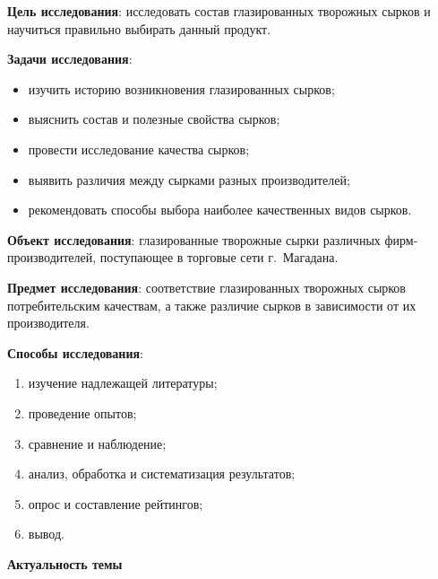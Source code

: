\bigskip
{}



\makeProcTitleSchool


\textbf{Цель исследования}: исследовать состав глазированных творожных сырков и научиться правильно выбирать данный продукт.

\textbf{Задачи исследования}:
\begin{itemize}[noitemsep]\vspace{-8pt}
\item изучить историю возникновения глазированных сырков;
\item выяснить состав и полезные свойства сырков;
\item провести исследование качества сырков;
\item выявить различия между сырками разных производителей;
\item рекомендовать способы выбора наиболее качественных видов сырков.
\end{itemize}\vspace{-8pt}

\textbf{Объект исследования}: глазированные творожные сырки различных фирм-произ\-во\-ди\-те\-лей, поступающее в торговые сети г.~Магадана.

\textbf{Предмет исследования}: соответствие глазированных творожных сырков потребительским качествам, а также различие сырков в зависимости от их производителя.

\textbf{Способы исследования}:
\begin{enumerate}[noitemsep]\vspace{-8pt}
\item изучение надлежащей литературы;
\item проведение опытов;
\item сравнение и наблюдение;
\item анализ, обработка и систематизация результатов;
\item опрос и составление рейтингов;
\item вывод.
\end{enumerate}\vspace{-8pt}

\textbf{Актуальность темы}

